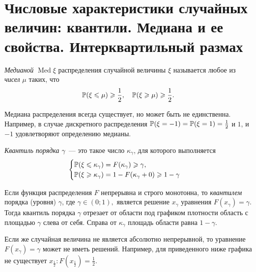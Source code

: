 \section {Числовые характеристики случайных величин: квантили. Медиана и ее свойства. Интерквартильный размах}

\begin{defn}
    \textit{Медианой} $\operatorname{Med} \xi$ распределения случайной величины $\xi$ называется любое из \textit{чисел} $\mu$ таких, что
    \begin{equation*}
        \operatorname{\mathbb{P}}(\xi \leqslant \mu) \geqslant \frac{1}{2}, ~~~ \operatorname{\mathbb{P}}(\xi \geqslant \mu) \geqslant \frac{1}{2}.
    \end{equation*}
\end{defn} 

\begin{rmrk}
    Медиана распределения всегда существует, но может быть не единственна. 
    Например, в случае дискретного распределения $\operatorname{\mathbb{P}}(\xi = -1) = \operatorname{\mathbb{P}}(\xi = 1) = \frac{1}{2}$ и $1$, и $-1$ удовлетворяют определению медианы.
\end{rmrk} 

\begin{defn}
\textit{Квантиль порядка $\gamma$}~--- это такое число $\kappa_\gamma$, для которого выполняется
\begin{equation*}
    \begin{cases} 
        \operatorname{\mathbb{P}}(\xi \leqslant \kappa_\gamma) = F(\kappa_\gamma) \geqslant \gamma, \\
        \operatorname{\mathbb{P}}(\xi \geqslant \kappa_\gamma) = 1 - F(\kappa_\gamma + 0) \geqslant 1 - \gamma 
    \end{cases}
\end{equation*}
\end{defn}

\begin{rmrk}
    Если функция распределения $F$ непрерывна и строго монотонна, то \textit{квантилем} порядка (уровня) $\gamma$, где $\gamma \in (0; 1), $ является решение $x_\gamma$ уравнения $F(x_\gamma) = \gamma.$ 
    Тогда квантиль порядка $\gamma$ отрезает от области под графиком плотности область с площадью $\gamma$ слева от себя. Справа от $\kappa_\gamma$ площадь области равна $1 - \gamma$.
    
    Если же случайная величина не является абсолютно непрерывной, то уравнение $F(x_\gamma) = \gamma$ может не иметь решений. Например, для приведенного ниже графика не существует $x_{\frac{1}{2}}: F(x_{\frac{1}{2}}) = \frac{1}{2}$.
    
\end{rmrk} 


